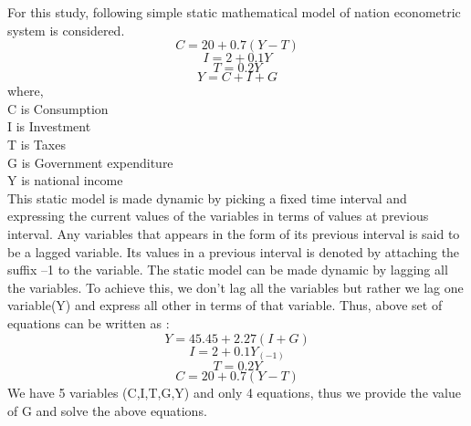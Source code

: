 \documentclass[10pt,journal,cspaper,compsoc]{IEEEtran}
\begin{document}
  For this study, following simple static mathematical model of nation econometric system is considered.
  \begin{equation}
    C = 20 + 0.7 (Y-T)
  \end{equation}
  \begin{equation}
    I = 2 + 0.1 Y
  \end{equation}
  \begin{equation}
    T = 0.2 Y
  \end{equation}
  \begin{equation}
    Y = C + I + G
  \end{equation} 
    where,\\
    C is Consumption\\
    I is Investment\\
    T is Taxes\\
    G is Government expenditure\\
    Y is national income\\

    This static model is made dynamic by picking a fixed time interval and expressing the
    current values of the variables in terms of values at previous interval. Any variables that appears in the form of its previous interval is said to be a lagged variable. Its values in a previous interval is denoted by attaching the suffix –1 to the variable. The static model can be made dynamic by lagging all the variables. To achieve this, we don't lag all the variables but rather we lag one variable(Y) and express all other in terms of that variable.
    Thus, above set of equations can be written as : 
    \begin{equation}
      Y = 45.45 + 2.27 (I + G)
    \end{equation}
    \begin{equation}
      I = 2 + 0.1 Y_(-1)
    \end{equation}
    \begin{equation}
      T = 0.2 Y
    \end{equation}
    \begin{equation}
      C = 20 + 0.7 ( Y - T )
    \end{equation}
    We have 5 variables (C,I,T,G,Y) and only 4 equations, thus we provide the value of G and solve the above equations. 
\end{document}
